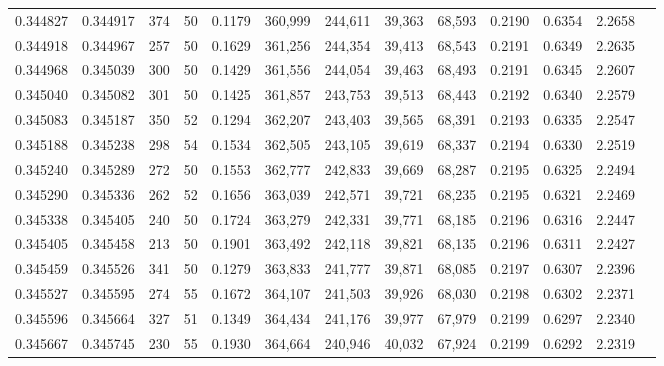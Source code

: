 \begin{tabular}{rrrrrrrrrrrrr}
0.344827 & 0.344917 &   374 &  50 &                                     0.1179 & 360,999 & 244,611 &  39,363 &  68,593 & 0.2190 & 0.6354 & 2.2658 \\
0.344918 & 0.344967 &   257 &  50 &                                     0.1629 & 361,256 & 244,354 &  39,413 &  68,543 & 0.2191 & 0.6349 & 2.2635 \\
0.344968 & 0.345039 &   300 &  50 &                                     0.1429 & 361,556 & 244,054 &  39,463 &  68,493 & 0.2191 & 0.6345 & 2.2607 \\
0.345040 & 0.345082 &   301 &  50 &                                     0.1425 & 361,857 & 243,753 &  39,513 &  68,443 & 0.2192 & 0.6340 & 2.2579 \\
0.345083 & 0.345187 &   350 &  52 &                                     0.1294 & 362,207 & 243,403 &  39,565 &  68,391 & 0.2193 & 0.6335 & 2.2547 \\
0.345188 & 0.345238 &   298 &  54 &                                     0.1534 & 362,505 & 243,105 &  39,619 &  68,337 & 0.2194 & 0.6330 & 2.2519 \\
0.345240 & 0.345289 &   272 &  50 &                                     0.1553 & 362,777 & 242,833 &  39,669 &  68,287 & 0.2195 & 0.6325 & 2.2494 \\
0.345290 & 0.345336 &   262 &  52 &                                     0.1656 & 363,039 & 242,571 &  39,721 &  68,235 & 0.2195 & 0.6321 & 2.2469 \\
0.345338 & 0.345405 &   240 &  50 &                                     0.1724 & 363,279 & 242,331 &  39,771 &  68,185 & 0.2196 & 0.6316 & 2.2447 \\
0.345405 & 0.345458 &   213 &  50 &                                     0.1901 & 363,492 & 242,118 &  39,821 &  68,135 & 0.2196 & 0.6311 & 2.2427 \\
0.345459 & 0.345526 &   341 &  50 &                                     0.1279 & 363,833 & 241,777 &  39,871 &  68,085 & 0.2197 & 0.6307 & 2.2396 \\
0.345527 & 0.345595 &   274 &  55 &                                     0.1672 & 364,107 & 241,503 &  39,926 &  68,030 & 0.2198 & 0.6302 & 2.2371 \\
0.345596 & 0.345664 &   327 &  51 &                                     0.1349 & 364,434 & 241,176 &  39,977 &  67,979 & 0.2199 & 0.6297 & 2.2340 \\
0.345667 & 0.345745 &   230 &  55 &                                     0.1930 & 364,664 & 240,946 &  40,032 &  67,924 & 0.2199 & 0.6292 & 2.2319 \\

\end{tabular}
